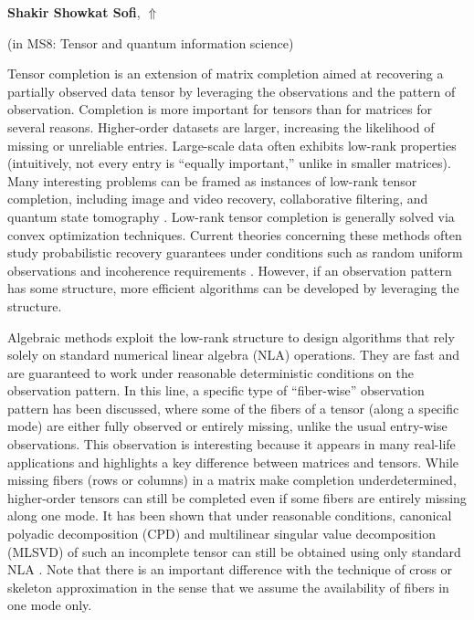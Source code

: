 \documentclass[ILAS2025-program.tex]{subfiles}
\begin{document}
     \hypertarget{down0020}{}\begin{ilasabstract}
    
    \textbf{Shakir Showkat Sofi},  \hfill \hyperlink{up0020}{$\Uparrow$}
    
    (in {\color{mstitle}MS8: Tensor and quantum information science})
        
        \mtskip
    \begin{bibunit}
        Tensor completion is an extension of matrix completion aimed at recovering a partially observed data tensor by leveraging the observations and the pattern of observation. Completion is more important for tensors than for matrices for several reasons. Higher-order datasets are larger, increasing the likelihood of missing or unreliable entries. Large-scale data often exhibits low-rank properties (intuitively, not every entry is ``equally important,'' unlike in smaller matrices). Many interesting problems can be framed as instances of low-rank tensor completion, including image and video recovery, collaborative filtering, and quantum state tomography \cite{liu2013tc, gross2010quantum}. Low-rank tensor completion is generally solved via convex optimization techniques. Current theories concerning these methods often study probabilistic recovery guarantees under conditions such as random uniform observations and incoherence requirements \cite{candes2009exact, liu2013tc}. However, if an observation pattern has some structure, more efficient algorithms can be developed by leveraging the structure.\par

Algebraic methods exploit the low-rank structure to design algorithms that rely solely on standard numerical linear algebra (NLA) operations. They are fast and are guaranteed to work under reasonable deterministic conditions on the observation pattern. In this line, a specific type of ``fiber-wise'' observation pattern has been discussed, where some of the fibers of a tensor (along a specific mode) are either fully observed or entirely missing, unlike the usual entry-wise observations. This observation is interesting because it appears in many real-life applications and highlights a key difference between matrices and tensors. While missing fibers (rows or columns) in a matrix make completion underdetermined, higher-order tensors can still be completed even if some fibers are entirely missing along one mode. It has been shown that under reasonable conditions, canonical polyadic decomposition (CPD) and multilinear singular value decomposition (MLSVD) of such an incomplete tensor can still be obtained using only standard NLA \cite{mikael2019fibersamp, stijn2023mlsvdfsj}. Note that there is an important difference with the technique of cross or skeleton approximation in the sense that we assume the availability of fibers in one mode only. \par


\end{bibunit}
\end{ilasabstract}
\end{document}
